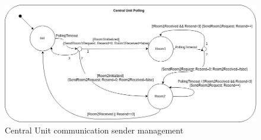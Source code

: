 \begin{figure}[H]
	\centering
	\includegraphics[width=12cm,keepaspectratio]{img/Com_SM_CU_Sender}
	\caption{Central Unit communication sender management}
	\label{fig:CU_com_sender}
\end{figure}
